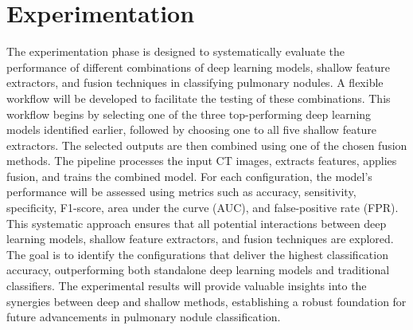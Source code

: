 \section{Experimentation}
The experimentation phase is designed to systematically evaluate the performance of different combinations of deep learning models, shallow feature extractors, and fusion techniques in classifying pulmonary nodules. A flexible workflow will be developed to facilitate the testing of these combinations. This workflow begins by selecting one of the three top-performing deep learning models identified earlier, followed by choosing one to all five shallow feature extractors. The selected outputs are then combined using one of the chosen fusion methods. The pipeline processes the input CT images, extracts features, applies fusion, and trains the combined model. For each configuration, the model's performance will be assessed using metrics such as accuracy, sensitivity, specificity, F1-score, area under the curve (AUC), and false-positive rate (FPR).
This systematic approach ensures that all potential interactions between deep learning models, shallow feature extractors, and fusion techniques are explored. The goal is to identify the configurations that deliver the highest classification accuracy, outperforming both standalone deep learning models and traditional classifiers. The experimental results will provide valuable insights into the synergies between deep and shallow methods, establishing a robust foundation for future advancements in pulmonary nodule classification.

    
    
    
    
    

